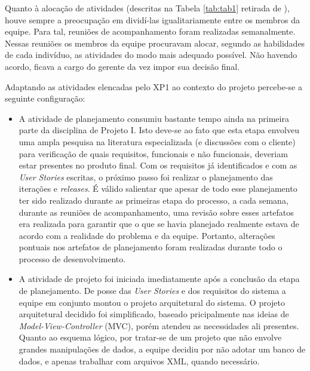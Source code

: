 Quanto à alocação de atividades (descritas na Tabela \ref{tab:tab1} retirada de \cite{xp1}), houve sempre a preocupação em dividí-las igualitariamente entre os membros da equipe. Para tal, reuniões de acompanhamento foram realizadas semanalmente. Nessas reuniões os membros da equipe procuravam alocar, segundo as habilidades de cada indivíduo, as atividades do modo mais adequado possível. Não havendo acordo, ficava a cargo do gerente da vez impor sua decisão final.

Adaptando as atividades elencadas pelo XP1 ao contexto do projeto percebe-se a seguinte configuração: 
\begin{itemize}
 \item  A atividade de planejamento consumiu bastante tempo ainda na primeira parte da disciplina de Projeto I. Isto deve-se ao fato que esta etapa envolveu uma ampla pesquisa na literatura especializada (e discussões com o cliente) para verificação de quais requisitos, funcionais e não funcionais, deveriam estar presentes no produto final. Com os requisitos já identificados e com as \textit{User Stories} escritas, o próximo passo foi realizar o planejamento das iterações e \textit{releases}. É válido salientar que apesar de todo esse planejamento ter sido realizado durante as primeiras etapa do processo, a cada semana, durante as reuniões de acompanhamento, uma revisão sobre esses artefatos era realizada para garantir que o que se havia planejado realmente estava de acordo com a realidade do problema e da equipe. Portanto, alterações pontuais nos artefatos de planejamento foram realizadas durante todo o processo de desenvolvimento.
 \item A atividade de projeto foi iniciada imediatamente após a conclusão da etapa de planejamento. De posse das \textit{User Stories} e dos requisitos do sistema a equipe em conjunto montou o projeto arquitetural do sistema. O projeto arquitetural decidido foi simplificado, baseado pricipalmente nas ideias de \textit{Model-View-Controller} (MVC), porém atendeu as necessidades ali presentes. Quanto ao esquema lógico, por tratar-se de um projeto que não envolve grandes manipulações de dados, a equipe decidiu por não adotar um banco de dados, e apenas trabalhar com arquivos XML, quando necessário.

\end{itemize}

